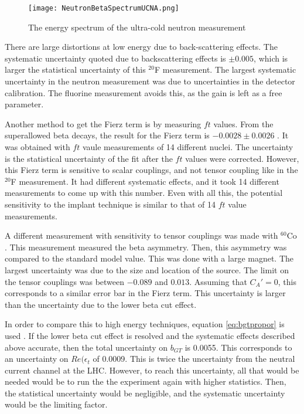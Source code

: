 \documentclass[../MaxHughesThesis.tex]{subfiles}
\begin{document}
\begin{figure}[!htb]
	\centerline{\texttt{[image: NeutronBetaSpectrumUCNA.png]}}
	\caption{The energy spectrum of the ultra-cold neutron measurement \cite{Hic17}}
	\label{fig:ucnabeta}
\end{figure}

There are large distortions at low energy due to back-scattering effects. 
The systematic uncertainty quoted due to backscattering effects is $\pm 0.005$, which is larger the statistical uncertainty of this $^{20}$F measurement.
The largest systematic uncertainty in the neutron measurement was due to uncertainties in the detector calibration.
The fluorine measurement avoids this, as the gain is left as a free parameter.

Another method to get the Fierz term is by measuring $ft$ values.
From the superallowed beta decays, the result for the Fierz term is $-0.0028 \pm 0.0026$ \cite{Har17}.
It was obtained with $ft$ vaule measurements of 14 different nuclei. 
The uncertainty is the statistical uncertainty of the fit after the $ft$ values were corrected.
However, this Fierz term is sensitive to scalar couplings, and not tensor coupling like in the $^{20}$F measurement.
It had different systematic effects, and it took 14 different measurements to come up with this number.
Even with all this, the potential sensitivity to the implant technique is similar to that of 14 $ft$ value measurements.

A different measurement with sensitivity to tensor couplings was made with $^{60}$Co \cite{Wau10}.
This measurement measured the beta asymmetry.
Then, this asymmetry was compared to the standard model value.
This was done with a large magnet. 
The largest uncertainty was due to the size and location of the source.
The limit on the tensor couplings was between $-0.089$ and $0.013$.
Assuming that $C_{A}' = 0$, this corresponds to a similar error bar in the Fierz term.
This uncertainty is larger than the uncertainty due to the lower beta cut effect.

In order to compare this to high energy techniques, equation \ref{eq:bgtpropor} is used \cite{Gon19}.
If the lower beta cut effect is resolved and the systematic effects described above accurate, then the total uncertainty on $b_{GT}$ is 0.0055. 
This corresponds to an uncertainty on $Re(\epsilon_{t}$ of 0.0009.
This is twice the uncertainty from the neutral current channel at the LHC. 
However, to reach this uncertainty, all that would be needed would be to run the the experiment again with higher statistics. 
Then, the statistical uncertainty would be negligible, and the systematic uncertainty would be the limiting factor. 
\end{document}
